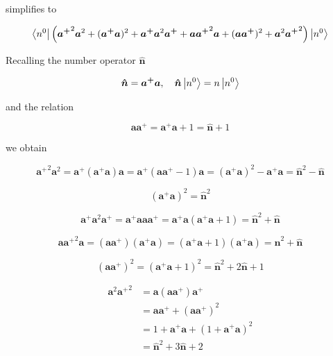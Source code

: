 \documentclass{article}
\begin{document}
simplifies to

\begin{equation}
\label{eq:simplified_a_sandwich}
\bra{n^0} \left( {\bm{a^+}}^2 \bm{a}^2 + (\bm{a^+} \bm{a})^2 + \bm{a^+} \bm{a}^2 \bm{a^+} + \bm{a} {\bm{a^+}}^2 \bm{a} + (\bm{a} \bm{a^+})^2 + \bm{a}^2 {\bm{a^+}}^2 \right) \ket{n^0}
\end{equation}

Recalling the number operator \( \bm{ \hat{n} } \)

\begin{equation}
\bm{ \hat{n} } = \bm{a^+} \bm{a}, \quad \bm{ \hat{n} } \ket{n^0} = n\ket{n^0}
\end{equation}

and the relation

\begin{equation}
\bm{a} \bm{a^+} = \bm{a^+} \bm{a} + 1 = \bm{ \hat{n} } + 1
\end{equation}

we obtain

\begin{equation}
{\bm{a^+}}^2 \bm{a}^2 = \bm{a^+} (\bm{a^+} \bm{a}) \bm{a} = \bm{a^+} ( \bm{a} \bm{a^+} - 1) \bm{a} = (\bm{a^+} \bm{a})^2 - \bm{a^+} \bm{a} = \bm{ \hat{n} }^2 - \bm{ \hat{n} }
\end{equation}

\begin{equation}
(\bm{a^+} \bm{a})^2 = \bm{ \hat{n} }^2
\end{equation}

\begin{equation}
\bm{a^+} \bm{a}^2 \bm{a^+} = \bm{a^+} \bm{a} \bm{a} \bm{a^+} = \bm{a^+} \bm{a} (\bm{a^+} \bm{a} + 1) = \bm{ \hat{n} }^2 + \bm{ \hat{n} }
\end{equation}

\begin{equation}
\bm{a} {\bm{a^+}}^2 \bm{a} = (\bm{a} \bm{a^+})(\bm{a^+} \bm{a}) = (\bm{a^+} \bm{a} + 1) (\bm{a^+} \bm{a}) = \bm{ \hat{n} }^2 + \bm{ \hat{n} }
\end{equation}

\begin{equation}
(\bm{a} \bm{a^+})^2 = (\bm{a^+} \bm{a} + 1)^2 = \bm{ \hat{n} }^2 + 2 \bm{ \hat{n} } + 1
\end{equation}

\begin{align}
\bm{a}^2 {\bm{a^+}}^2 & = \bm{a} (\bm{a} \bm{a^+}) \bm{a^+} \nonumber \\
& = \bm{a} \bm{a^+} + (\bm{a} \bm{a^+})^2 \nonumber \\
& = 1 + \bm{a^+} \bm{a} + (1 + \bm{a^+} \bm{a})^2 \nonumber \\
& = \bm{ \hat{n} }^2 + 3 \bm{ \hat{n} } + 2
\end{align}
\end{document}
